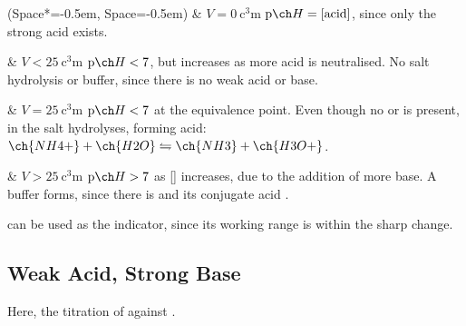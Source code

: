 			\begin{bulletlist}
				\ListProperties(Space*=-0.5em, Space=-0.5em)
				& $V = \SI{0}{\cubic\centi\metre}$
					\tabto{25mm}$\MpH = [\mathrm{acid}]$, since only the strong acid exists.

				& $V < \SI{25}{\cubic\centi\metre}$
					\tabto{25mm}$\MpH < 7$, but increases as more acid is neutralised.
					\tabto{25mm}No salt hydrolysis or buffer, since there is no weak acid or base.

				& $V = \SI{25}{\cubic\centi\metre}$
					\tabto{25mm}$\MpH < 7$ at the equivalence point.
					\tabto{25mm}Even though no  or  is present,  in the salt hydrolyses,
					\tabto{25mm}forming acid: $\ch{NH4+} + \ch{H2O} \leftrightharpoons \ch{NH3} + \ch{H3O+}$.

				& $V > \SI{25}{\cubic\centi\metre}$
					\tabto{25mm}$\MpH > 7$ as [] increases, due to the addition of more base.
					\tabto{25mm}A buffer forms, since there is  and its conjugate acid .

			\end{bulletlist}

			 can be used as the indicator, since its working range is within the sharp \pH{} change.















		\pagebreak
		\subsection{Weak Acid, Strong Base}

			Here, the titration of  against .

